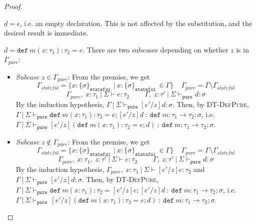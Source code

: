 \documentclass{llncs}
\newcommand{\keywadj}[1]{\mathtt{#1}}
\newcommand{\keyw}[1]{\keywadj{#1}~}
\newcommand{\pcase}[1][]{
  \if\relax\detokenize{#1}\relax
    \def\thiscase{}
  \else
    \def\thiscase{~#1}
  \fi
  \item
}
\begin{document}
\begin{proof}
\begin{pcases}
\pcase[\textsc{DT-Empty}]
$d = \epsilon$, i.e. an empty declaration. This is not affected by the substitution, and the desired result is immediate.
\\
\pcase[\textsc{DT-DefPure}]
$d = \keyw{def} m(x : \tau_1) : \tau_2 = e$. There are two subcases depending on whether $z$ is in $\Gamma_{pure}$:
\\
\begin{itemize}
\item[] \textit{Subcase $z \in \Gamma_{pure}$}: From the premise, we get
\[
\Gamma_{stateful} = \{x : \{ \sigma \}_{\keyw{stateful}} ~|~ x : \{ \sigma \}_{\keyw{stateful}} \in \Gamma\}~~~~~\Gamma_{pure} = \Gamma \setminus \Gamma_{stateful}
\]\[
\Gamma_{pure},~x : \tau_1~|~\Sigma \vdash e : \tau_2~~~~~~~~~~\Gamma,~z : \tau'~|~\Sigma \vdash_{\keywadj{pure}} d : \sigma
\]
By the induction hypothesis, $\Gamma~|~\Sigma \vdash_{\keywadj{pure}} [e'/z]d : \sigma$. Then, by \textsc{DT-DefPure}, $\Gamma~|~\Sigma \vdash_{\keywadj{pure}} \keyw{def} m(x : \tau_1) : \tau_2 = e; [e'/z]d~:~\keyw{def} m : \tau_1 \rightarrow \tau_2; \sigma$, i.e. $\Gamma~|~\Sigma \vdash_{\keywadj{pure}} [e'/z](\keyw{def} m(x : \tau_1) : \tau_2 = e; d)~:~\keyw{def} m : \tau_1 \rightarrow \tau_2; \sigma$.
\\
\item[] \textit{Subcase $z \not\in \Gamma_{pure}$}: From the premise, we get
\[
\Gamma_{stateful} = \{x : \{ \sigma \}_{\keyw{stateful}} ~|~ x : \{ \sigma \}_{\keyw{stateful}} \in \Gamma\}~~~~~\Gamma_{pure} = \Gamma \setminus \Gamma_{stateful}
\]\[
\Gamma_{pure},~x : \tau_1,~z : \tau'~|~\Sigma \vdash e : \tau_2~~~~~~~~~~\Gamma,~z : \tau'~|~\Sigma \vdash_{\keywadj{pure}} d : \sigma
\]
By the induction hypothesis, $\Gamma_{pure},~x : \tau_1~|~\Sigma \vdash [e'/z]e : \tau_2$ and $\Gamma~|~\Sigma \vdash_{\keywadj{pure}} [e'/z]d : \sigma$. Then, by \textsc{DT-DefPure}, $\Gamma~|~\Sigma \vdash_{\keywadj{pure}} \keyw{def} m(x : \tau_1) : \tau_2 = [e'/z]e; [e'/z]d~:~\keyw{def} m : \tau_1 \rightarrow \tau_2; \sigma$, i.e. $\Gamma~|~\Sigma \vdash_{\keyw{pure}} [e'/z](\keyw{def} m(x : \tau_1) : \tau_2 = e; d)~:~\keyw{def} m : \tau_1 \rightarrow \tau_2; \sigma$.
\\
\end{itemize}


\end{pcases}
\end{proof}
\end{document}
